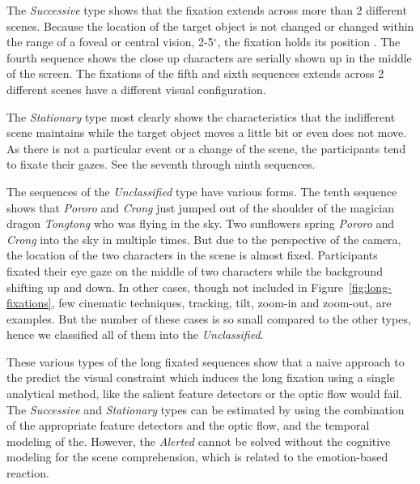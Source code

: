 \documentclass[10pt,letterpaper]{article}
\begin{document}
The \textit{Successive} type shows that the fixation extends across more than 2 different scenes. Because the location of the target object is not changed or changed within the range of a foveal or central vision, 2-5$^{\circ}$, the fixation holds its position \cite{mcmorris2014acquisition}. The fourth sequence shows the close up characters are serially shown up in the middle of the screen. The fixations of the fifth and sixth sequences extends across 2 different scenes have a different visual configuration.

The \textit{Stationary} type most clearly shows the characteristics that the indifferent scene maintains while the target object moves a little bit or even does not move. As there is not a particular event or a change of the scene, the participants tend to fixate their gazes. See the seventh through ninth sequences.

The sequences of the \textit{Unclassified} type have various forms. The tenth sequence shows that \textit{Pororo} and \textit{Crong} just jumped out of the shoulder of the magician dragon \textit{Tongtong} who was flying in the sky. Two sunflowers spring \textit{Pororo} and \textit{Crong} into the sky in multiple times. But due to the perspective of the camera, the location of the two characters in the scene is almost fixed. Participants fixated their eye gaze on the middle of two characters while the background shifting up and down. In other cases, though not included in Figure~\ref{fig:long-fixations}, few cinematic techniques, tracking, tilt, zoom-in and zoom-out, are examples. But the number of these cases is so small compared to the other types, hence we classified all of them into the \textit{Unclassified}.

These various types of the long fixated sequences show that a naive approach to the predict the visual constraint which induces the long fixation using a single analytical method, like the salient feature detectors \cite{marr1980,canny1986} or the optic flow \cite{koenderink1986} would fail. The \textit{Successive} and \textit{Stationary} types can be estimated by using the combination of the appropriate feature detectors and the optic flow, and the temporal modeling of the. However, the \textit{Alerted} cannot be solved without the cognitive modeling for the scene comprehension, which is related to the emotion-based reaction. 
\end{document}
